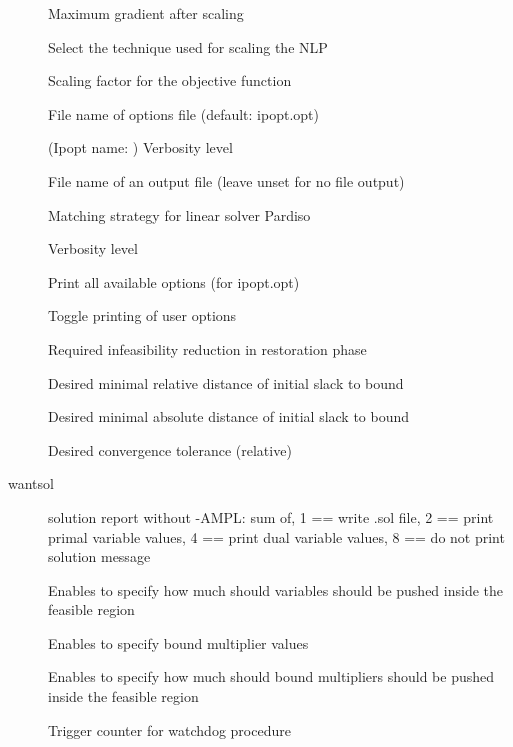 \begin{description}
\item[{}] Maximum gradient after scaling
\item[{}] Select the technique used for scaling the NLP
\item[{}] Scaling factor for the objective function
\item[{}] File name of options file (default: ipopt.opt)
\item[{}] (Ipopt name: ) Verbosity level
\item[{}] File name of an output file (leave unset for no file output)
\item[{}] Matching strategy for linear solver Pardiso
\item[{}] Verbosity level
\item[{}] Print all available options (for ipopt.opt)
\item[{}] Toggle printing of user options
\item[{}] Required infeasibility reduction in restoration phase
\item[{}] Desired minimal relative distance of initial slack to bound
\item[{}] Desired minimal absolute distance of initial slack to bound
\item[{}] Desired convergence tolerance (relative)
\item[wantsol] solution report without -AMPL: sum of, 		1 == write .sol file, 		2 == print primal variable values, 		4 == print dual variable values, 		8 == do not print solution message
\item[{}] Enables to specify how much should variables should be pushed inside the feasible region
\item[{}] Enables to specify bound multiplier values
\item[{}] Enables to specify how much should bound multipliers should be pushed inside the feasible region
\item[{}] Trigger counter for watchdog procedure
\end{description}
